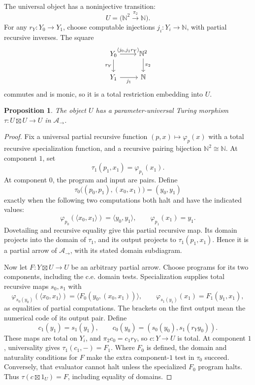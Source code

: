 \documentclass[11pt]{article}
\newtheorem{proposition}[theorem]{Proposition}
\theoremstyle{definition}\newtheorem{definition}[theorem]{Definition}
\theoremstyle{remark}\newtheorem{remark}[theorem]{Remark}
\newcommand{\A}{\mathscr A}
\newcommand{\N}{\mathbb N}
\begin{document}
The universal object has a noninjective transition:
\[
 U=\bigl(\N^2\xrightarrow{\pi_2}\N\bigr).
\]
For any \(r_Y:Y_0\to Y_1\), choose computable injections
\(j_i:Y_i\to\N\), with partial recursive inverses. The square
\[
\begin{tikzcd}
 Y_0\arrow[r,"{\langle j_0,j_1r_Y\rangle}"]\arrow[d,"r_Y"']&
 \N^2\arrow[d,"\pi_2"]\\
 Y_1\arrow[r,"j_1"']&\N
\end{tikzcd}
\]
commutes and is monic, so it is a total restriction embedding
into \(U\).

\begin{proposition}\label{prop:cosheaf-turing}
The object \(U\) has a parameter-universal Turing morphism
\(\tau:U\boxtimes U\to U\) in \(\A_\to\).
\end{proposition}
\begin{proof}
Fix a universal partial recursive function \((p,x)\mapsto\varphi_p(x)\)
with a total recursive specialization function, and a recursive
pairing bijection \(\N^2\cong\N\). At component \(1\), set
\[
 \tau_1(p_1,x_1)=\varphi_{p_1}(x_1).
\]
At component \(0\), the program and input are pairs. Define
\[
 \tau_0\bigl((p_0,p_1),(x_0,x_1)\bigr)=(y_0,y_1)
\]
exactly when the following two computations both halt and have
the indicated values:
\[
 \varphi_{p_0}(\langle x_0,x_1\rangle)=\langle y_0,y_1\rangle,
 \qquad \varphi_{p_1}(x_1)=y_1.
\]
Dovetailing and recursive equality give this partial recursive map.
Its domain projects into the domain of \(\tau_1\), and its output
projects to \(\tau_1(p_1,x_1)\). Hence it is a partial arrow of
\(\A_\to\), with its stated domain subdiagram.

Now let \(F:Y\boxtimes U\to U\) be an arbitrary partial arrow.
Choose programs for its two components, including the c.e. domain
tests. Specialization supplies total recursive maps \(s_0,s_1\)
with
\[
 \varphi_{s_0(y_0)}(\langle x_0,x_1\rangle)
     =\langle F_0(y_0,(x_0,x_1))\rangle,\qquad
 \varphi_{s_1(y_1)}(x_1)=F_1(y_1,x_1),
\]
as equalities of partial computations. The brackets on the first
output mean the numerical code of its output pair.
Define
\[
 c_1(y_1)=s_1(y_1),\qquad
 c_0(y_0)=(s_0(y_0),s_1(r_Yy_0)).
\]
These maps are total on \(Y_i\), and
\(\pi_2c_0=c_1r_Y\), so \(c:Y\to U\) is total.
At component \(1\), universality gives \(\tau_1(c_1,-)=F_1\).
Where \(F_0\) is defined, the domain and naturality conditions
for \(F\) make the extra component-\(1\) test in \(\tau_0\)
succeed. Conversely, that evaluator cannot halt unless the
specialized \(F_0\) program halts. Thus
\(\tau(c\boxtimes1_U)=F\), including equality of domains.
\end{proof}
\end{document}
